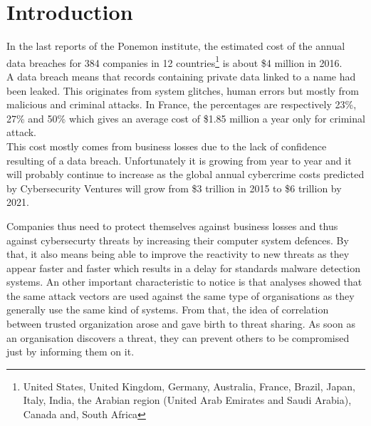 \documentclass{eplmastersthesis}
\begin{document}
\section{Introduction}
In the last reports of the Ponemon institute\cite{ponemon2016cost, ponemon2016costFr}, the estimated cost of the annual data breaches for 384 companies in 12 countries\footnote{United States, United Kingdom, Germany, Australia, France, Brazil, Japan, Italy, India, the Arabian region (United Arab Emirates and Saudi Arabia), Canada and, South Africa} is about \$4 million in 2016.\\
A data breach means that records containing private data linked to a name had been leaked. This originates from system glitches, human errors but  mostly from malicious and criminal attacks. In France, the percentages are respectively 23\%, 27\% and 50\% which gives an average cost of \$1.85 million a year only for criminal attack.\\
This cost mostly comes from business losses due to the lack of confidence resulting of a data breach. Unfortunately it is growing from year to year and it will probably continue to increase as the global annual cybercrime costs predicted by Cybersecurity Ventures will grow from  \$3 trillion in 2015 to \$6 trillion by 2021.

Companies thus need to protect themselves against business losses and thus against cybersecurty threats by increasing their computer system defences. By that, it also means being able to improve the reactivity to new threats as they appear faster and faster which results in a delay for standards malware detection systems. An other important characteristic to notice is that analyses showed that the same attack vectors are used against the same type of organisations as they generally use the same kind of systems. From that, the idea of correlation between trusted organization arose and gave birth to threat sharing.  As soon as an organisation discovers a threat, they can prevent others to be compromised just by informing them on it.\\
\end{document}
